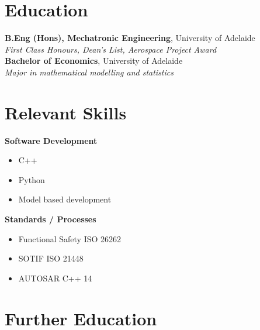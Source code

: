\documentclass[10pt,a4paper]{article}
\begin{document}
\vspace{1.2em}

\section*{Education}

\textbf{B.Eng (Hons), Mechatronic Engineering}, University of Adelaide \\
\textit{First Class Honours, Dean's List, Aerospace Project Award} \\[4pt]
\textbf{Bachelor of Economics}, University of Adelaide \\
\textit{Major in mathematical modelling and statistics}

\vspace{1.2em}

\section*{Relevant Skills}

\begin{minipage}[t]{0.48\textwidth}
    \textbf{\textcolor{primary}{Software Development}}
    \begin{itemize}
        \item C++
        \item Python
        \item Model based development
    \end{itemize}
\end{minipage}
\hfill
\begin{minipage}[t]{0.48\textwidth}
    \textbf{\textcolor{primary}{Standards / Processes}}
    \begin{itemize}
        \item Functional Safety ISO 26262
        \item SOTIF ISO 21448
        \item AUTOSAR C++ 14
    \end{itemize}
\end{minipage}

\vspace{1.2em}

\section*{Further Education}
\end{document}
